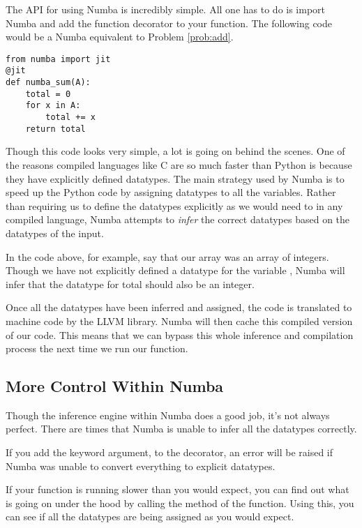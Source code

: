 The API for using Numba is incredibly simple.
All one has to do is import Numba and add the  function decorator to your function.
The following code would be a Numba equivalent to Problem \ref{prob:add}.

\begin{lstlisting}
from numba import jit
@jit
def numba_sum(A):
    total = 0
    for x in A:
        total += x
    return total
\end{lstlisting}

Though this code looks very simple, a lot is going on behind the scenes.
One of the reasons compiled languages like C are so much faster than Python is because they have explicitly defined datatypes.
The main strategy used by Numba is to speed up the Python code by assigning datatypes to all the variables.
Rather than requiring us to define the datatypes explicitly as we would need to in any compiled language, Numba attempts to \emph{infer} the correct datatypes based on the datatypes of the input.

In the code above, for example, say that our array  was an array of integers.
Though we have not explicitly defined a datatype for the variable , Numba will infer that the datatype for total should also be an integer.

Once all the datatypes have been inferred and assigned, the code is translated to machine code by the LLVM library.
Numba will then cache this compiled version of our code.
This means that we can bypass this whole inference and compilation process the next time we run our function.

\subsection*{More Control Within Numba} %

Though the inference engine within Numba does a good job, it's not always perfect.
There are times that Numba is unable to infer all the datatypes correctly.

If you add the keyword argument,  to the  decorator, an error will be raised if Numba was unable to convert everything to explicit datatypes.

If your function is running slower than you would expect, you can find out what is going on under the hood by calling the  method of the function.
Using this, you can see if all the datatypes are being assigned as you would expect.

